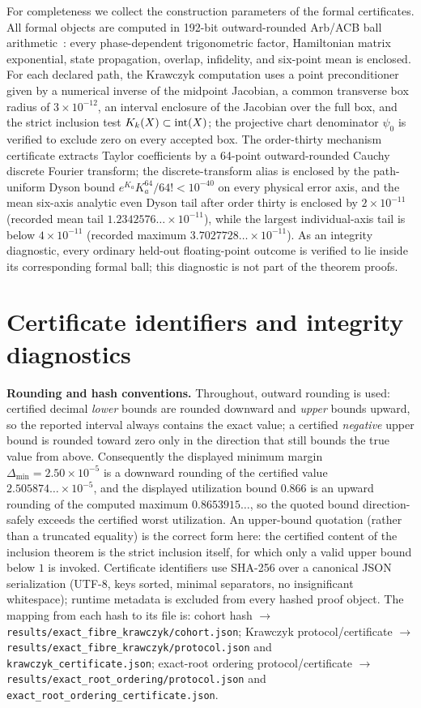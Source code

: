For completeness we collect the construction parameters of the formal certificates. All
formal objects are computed in 192-bit outward-rounded Arb/ACB ball
arithmetic~\cite{johansson2017}: every phase-dependent trigonometric factor, Hamiltonian
matrix exponential, state propagation, overlap, infidelity, and six-point mean is enclosed.
For each declared path, the Krawczyk computation uses a point preconditioner given by a
numerical inverse of the midpoint Jacobian, a common transverse box radius of
$3\times10^{-12}$, an interval enclosure of the Jacobian over the full box, and the strict
inclusion test $K_{k}(X)\subset\operatorname{int}(X)$; the projective chart denominator $\psi_{0}$ is
verified to exclude zero on every accepted box. The order-thirty mechanism certificate
extracts Taylor coefficients by a 64-point outward-rounded Cauchy discrete Fourier
transform; the discrete-transform alias is enclosed by the path-uniform Dyson bound
$e^{K_{a}}K_{a}^{64}/64!<10^{-40}$ on every physical error axis, and the mean six-axis
analytic even Dyson tail after order thirty is enclosed by $2\times10^{-11}$ (recorded
mean tail $1.2342576\ldots\times10^{-11}$), while the largest individual-axis tail is
below $4\times10^{-11}$ (recorded maximum $3.7027728\ldots\times10^{-11}$). As an integrity
diagnostic,
every ordinary held-out floating-point outcome is verified to lie inside its corresponding
formal ball; this diagnostic is not part of the theorem proofs.

\section{Certificate identifiers and integrity diagnostics}\label{app:hashes}

\textbf{Rounding and hash conventions.} Throughout, outward rounding is used: certified
decimal \emph{lower} bounds are rounded downward and \emph{upper} bounds upward, so the
reported interval always contains the exact value; a certified \emph{negative} upper bound
is rounded toward zero only in the direction that still bounds the true value from above.
Consequently the displayed minimum margin $\Delta_{\min}=2.50\times10^{-5}$ is a downward
rounding of the certified value $2.505874\ldots\times10^{-5}$, and the displayed
utilization bound $0.866$ is an upward rounding of the computed maximum
$0.8653915\ldots$, so the quoted bound direction-safely exceeds the certified worst
utilization. An upper-bound quotation (rather than a truncated equality) is the correct
form here: the certified content of the inclusion theorem is the strict inclusion itself,
for which only a valid upper bound below $1$ is invoked. Certificate identifiers use
SHA-256 over a
canonical JSON serialization (UTF-8, keys sorted, minimal separators, no insignificant
whitespace); runtime metadata is excluded from every hashed proof object. The mapping from
each hash to its file is: cohort hash $\to$
\texttt{results/exact\_fibre\_krawczyk/cohort.json}; Krawczyk protocol/certificate $\to$
\texttt{results/exact\_fibre\_krawczyk/\allowbreak protocol.json} and
\texttt{krawczyk\_certificate.json}; exact-root ordering protocol/certificate $\to$
\texttt{results/exact\_root\_ordering/\allowbreak protocol.json} and
\texttt{exact\_root\_ordering\_certificate.json}.


